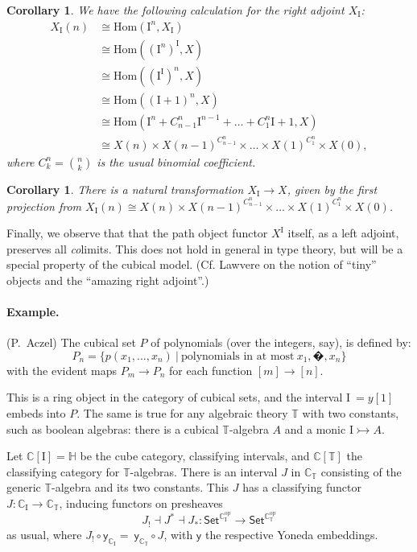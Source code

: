 \documentclass[11pt]{article}
\newcommand{\C}{\ensuremath{\mathbb{C}}}
\newcommand{\T}{\ensuremath{\mathbb{T}}}
\newcommand{\psh}[1]{\ensuremath{\mathsf{Set}^{#1^{\mathrm{op}}}}}
\newcommand{\y}{\ensuremath{\mathsf{y}}} %
\renewcommand{\hom}{\ensuremath{\mathrm{Hom}}}
\newcommand{\mono}{\ensuremath{\rightarrowtail}}
\newcommand{\I}{\ensuremath{\mathrm{I}}}
\renewcommand{\H}{\ensuremath{\mathbb{H}}}
\newtheorem{corollary}[theorem]{Corollary}
\theoremstyle{remark}
\theoremstyle{definition}
\begin{document}
\begin{corollary}
We have the following calculation for the right adjoint $X_\I$:
\begin{align*}
X_\I(n) &\cong \hom(\I^n, X_\I) \\
&\cong \hom((\I^n)^\I, X) \\
&\cong \hom((\I^\I)^n, X) \\
&\cong \hom((\I+1)^n, X) \\
&\cong \hom(\I^n + C^n_{n-1}\I^{n-1} + \dots + C^n_{1}\I+1, X) \\
&\cong X(n) \times X(n-1)^{C^n_{n-1}} \times \dots \times X(1)^{C^n_{1}}\times X(0),
\end{align*}
where $C^n_{k} = \binom{n}{k}$ is the usual binomial coefficient.
\end{corollary}

\begin{corollary}
There is a natural transformation $X_\I \to X$, given by the first projection from $X_\I(n)\cong X(n) \times X(n-1)^{C^n_{n-1}} \times \dots \times X(1)^{C^n_{1}}\times X(0)$.
\end{corollary}

Finally, we observe that that the path object functor $X^\I$ itself, as a left adjoint, preserves all \emph{co}limits.  This does not hold in general in type theory, but will be a special property of the cubical model.  (Cf. Lawvere \cite{ATOM} on the notion of ``tiny'' objects and the ``amazing right adjoint''.)  

\paragraph{Example.} (P.~Aczel)
The cubical set $P$ of polynomials (over the integers, say), is defined by:
\[
P_n = \{ p(x_1,..., x_n)\ |\  \text{polynomials in at most}\  x_1, �, x_n \}
\]
with the evident maps $P_m \to P_n$ for each function $[m] \to [n]$.

This is a ring object in the category of cubical sets, and the interval $\I\ = y[1]$ embeds into $P$.
The same is true for any algebraic theory $\T$ with two constants, such as boolean algebras: there is a cubical $\T$-algebra $A$ and a monic $\I \mono A$.

Let $\C[\I] = \H$ be the cube category, classifying intervals, and $\C[\T]$ the classifying category for $\T$-algebras.  There is an interval $J$ in $\C_\T$  consisting of the generic $\T$-algebra and its two constants.  This $J$ has a classifying functor $J : \C_\I \to \C_\T$, inducing functors on presheaves
\[
J_! \dashv J^* \dashv J_* : \psh{\C_\I} \to \psh{\C_\T}
\]
as usual, where $J_! \circ \y_{\C_\I} =\ \y_{\C_\T} \circ J$,  with $\y$ the respective Yoneda embeddings.
\end{document}
